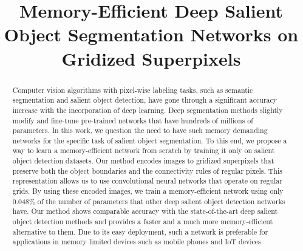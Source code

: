 \documentclass[a4paper,conference]{IEEEtran}
\begin{document}
\title{Memory-Efficient Deep Salient Object Segmentation Networks on Gridized Superpixels}


\author{
}










\maketitle

\begin{abstract}
Computer vision algorithms with pixel-wise labeling tasks, such as semantic segmentation and salient object detection, have gone through a significant accuracy increase with the incorporation of deep learning. %
Deep segmentation methods slightly modify and fine-tune pre-trained networks that have hundreds of millions of parameters.
In this work, we question the need to have such memory demanding networks for the specific task of salient object segmentation.
To this end, we propose a way to learn a memory-efficient network from scratch by training it only on salient object detection datasets.
Our method encodes images to gridized superpixels that preserve both the object boundaries and the connectivity rules of regular pixels.
This representation allows us to use convolutional neural networks that operate on regular grids.
By using these encoded images, we train a memory-efficient network using only 0.048\% of the number of parameters that other deep salient object detection networks have.
Our method shows comparable accuracy with the state-of-the-art deep salient object detection methods and provides a faster and a much more memory-efficient alternative to them.
Due to its easy deployment, such a network is preferable for applications in memory limited devices such as mobile phones and IoT devices.

\end{abstract}
\end{document}
